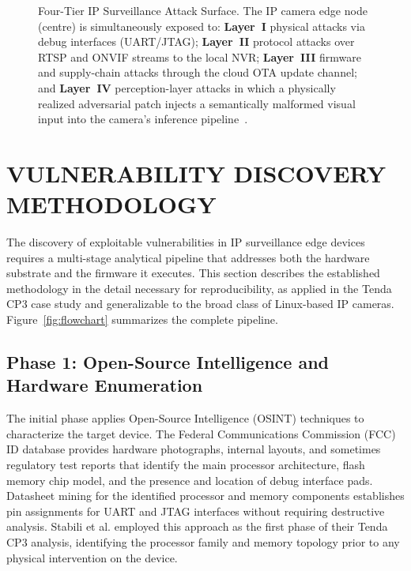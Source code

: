 \documentclass[letterpaper, 10pt, conference]{ieeeconf}
\begin{document}
\begin{figure}[t]

\caption{Four-Tier IP Surveillance Attack Surface. The IP camera
edge node (centre) is simultaneously exposed to: \textbf{Layer~I}
physical attacks via debug interfaces (UART/JTAG); \textbf{Layer~II}
protocol attacks over RTSP and ONVIF streams to the local NVR;
\textbf{Layer~III} firmware and supply-chain attacks through the
cloud OTA update channel; and \textbf{Layer~IV} perception-layer
attacks in which a physically realized adversarial patch injects a
semantically malformed visual input into the camera's inference
pipeline~\cite{thys2019,sharif2016}.}
\label{fig:attack_surface}
\end{figure}

\section{VULNERABILITY DISCOVERY METHODOLOGY}

The discovery of exploitable vulnerabilities in IP surveillance edge
devices requires a multi-stage analytical pipeline that addresses
both the hardware substrate and the firmware it executes. This section
describes the established methodology in the detail necessary for
reproducibility, as applied in the Tenda CP3 case study and
generalizable to the broad class of Linux-based IP cameras.
Figure~\ref{fig:flowchart} summarizes the complete pipeline.

\subsection{Phase 1: Open-Source Intelligence and Hardware Enumeration}

The initial phase applies Open-Source Intelligence (OSINT) techniques
to characterize the target device. The Federal Communications Commission
(FCC) ID database provides hardware photographs, internal layouts, and
sometimes regulatory test reports that identify the main processor
architecture, flash memory chip model, and the presence and location
of debug interface pads. Datasheet mining for the identified processor
and memory components establishes pin assignments for UART and JTAG
interfaces without requiring destructive analysis. Stabili et al.
\cite{stabili2024} employed this approach as the first phase of their
Tenda CP3 analysis, identifying the processor family and memory
topology prior to any physical intervention on the device.
\end{document}
